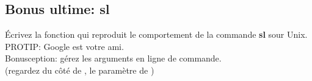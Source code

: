 \subsection{Bonus ultime: sl}

Écrivez la fonction  qui reproduit le comportement de la commande \textbf{sl} sour Unix.\\
PROTIP: Google est votre ami.\\
Bonusception: gérez les arguments en ligne de commande.\\
(regardez du côté de , le paramètre de )

